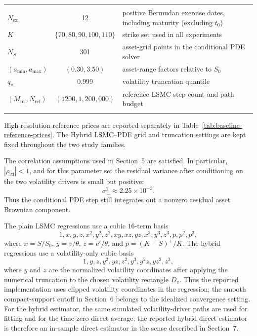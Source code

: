 \documentclass[pdflatex,sn-mathphys-num]{sn-jnl}
\makeatletter
\theoremstyle{thmstyleone}%
\theoremstyle{thmstylethree}%
\theoremstyle{thmstyletwo}%
\renewenvironment{table}[1][]{%
  \par\addvspace{12pt}%
  \noindent\begin{minipage}{\textwidth}%
  \def\@captype{table}%
  \centering%
  \tablebodyfont%
}{%
  \end{minipage}%
  \par\addvspace{12pt}%
}
\renewenvironment{tablenotes}[1][]{%
  \begin{list}{}{\setlength{\labelsep}{0pt}%
  \setlength{\labelwidth}{0pt}%
  \setlength{\leftmargin}{0pt}%
  \setlength{\rightmargin}{0pt}%
  \setlength{\topsep}{-6pt}%
  \setlength{\itemsep}{2pt}%
  \setlength{\partopsep}{0pt}%
  \setlength{\listparindent}{0em}%
  \setlength{\parsep}{0pt}}%
}{%
  \end{list}%
}
\makeatother
\begin{document}
\begin{table}[htbp]
\begin{threeparttable}
\begin{tabularx}{0.94\textwidth}{@{}l c X@{}}
\addlinespace
\multicolumn{3}{@{}l}{\textit{Fixed numerical setting}} \\
\(N_{\mathrm{ex}}\) & 12 & positive Bermudan exercise dates, including maturity (excluding \(t_0\)) \\
\(K\) & \(\{70,80,90,100,110\}\) & strike set used in all experiments \\
\(N_S\) & 301 & asset-grid points in the conditional PDE solver \\
\((a_{\min},a_{\max})\) & \((0.30,3.50)\) & asset-range factors relative to \(S_0\) \\
\(q_v\) & 0.999 & volatility truncation quantile \\
\((M_{\mathrm{ref}},N_{\mathrm{ref}})\) & \((1200,1{,}200{,}000)\) & reference LSMC step count and path budget \\
\botrule
\end{tabularx}
\begin{tablenotes}[flushleft]
\footnotesize
\item High-resolution reference prices are reported separately in Table~\ref{tab:baseline-reference-prices}. The Hybrid LSMC--PDE grid and truncation settings are kept fixed throughout the two study families.
\end{tablenotes}
\end{threeparttable}
\end{table}

The correlation assumptions used in Section~5 are satisfied. In particular,
\(|\rho_{23}|<1\), and for this parameter set the residual variance after
conditioning on the two volatility drivers is small but positive:
\[
    \sigma_\perp^2 \approx 2.25\times 10^{-3}.
\]
Thus the conditional PDE step still integrates out a nonzero residual asset
Brownian component.

The plain LSMC regressions use a cubic \(16\)-term basis
\[
1,x,y,z,x^2,y^2,z^2,xy,xz,yz,x^3,y^3,z^3,p,p^2,p^3,
\]
where \(x=S/S_0\), \(y=v/\theta\), \(z=v'/\theta\), and
\(p=(K-S)^+/K\). The hybrid regressions use a volatility-only cubic basis
\[
1,y,z,y^2,yz,z^2,y^3,y^2z,yz^2,z^3,
\]
where \(y\) and \(z\) are the normalized volatility coordinates after applying
the numerical truncation to the chosen volatility rectangle \(D_v\). Thus the
reported implementation uses clipped volatility coordinates in the regression;
the smooth compact-support cutoff in Section~6 belongs to the idealized
convergence setting. For the hybrid estimator, the same simulated
volatility-driver paths are used for fitting and for the time-zero direct
average; the reported hybrid direct estimator is therefore an in-sample direct
estimator in the sense described in Section~7.
\end{document}
